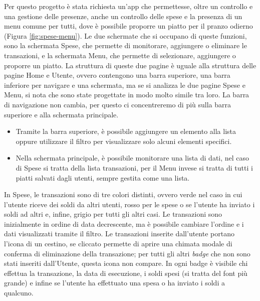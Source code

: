 Per questo progetto è stata richiesta un'app che permettesse, oltre un controllo e una gestione delle presenze, anche un controllo delle spese e la presenza di un menu comune per tutti, dove è possibile proporre un piatto per il pranzo odierno (Figura \ref{fig:spese-menu}).\newline
Le due schermate che si occupano di queste funzioni, sono la schermata Spese, che permette di monitorare, aggiungere o eliminare le transazioni, e la schermata Menu, che permette di selezionare, aggiungere o proporre un piatto.\newline
\newline
La struttura di queste due pagine è uguale alla struttura delle pagine Home e Utente, ovvero contengono una barra superiore, una barra inferiore per navigare e una schermata, ma se si analizza le due pagine Spese e Menu, si nota che sono state progettate in modo molto simile tra loro.\newline
La barra di navigazione non cambia, per questo ci concentreremo di più sulla barra superiore e alla schermata principale.
\begin{itemize}
    \item Tramite la barra superiore, è possibile aggiungere un elemento alla lista oppure utilizzare il filtro per visualizzare solo alcuni elementi specifici.
    \item Nella schermata principale, è possibile monitorare una lista di dati, nel caso di Spese si tratta della lista transazioni, per il Menu invese si tratta di tutti i piatti salvati dagli utenti, sempre gestita come una lista.
\end{itemize}
In Spese, le transazioni sono di tre colori distinti, ovvero verde nel caso in cui l'utente riceve dei soldi da altri utenti, rosso per le spese o se l'utente ha inviato i soldi ad altri e, infine, grigio per tutti gli altri casi.\newline
Le transazioni sono inizialmente in ordine di data decrescente, ma è possibile cambiare l'ordine e i dati visualizzati tramite il filtro.\newline
Le transazioni inserite dall'utente portano l'icona di un cestino, se cliccato permette di aprire una chimata modale di conferma di eliminazione della transazione; per tutti gli altri \emph{badge} che non sono stati inseriti dall'Utente, questa icona non compare.\newline
In ogni badge è visibile chi effettua la transazione, la data di esecuzione, i soldi spesi (si tratta del font più grande) e infine se l'utente ha effettuato una spesa o ha inviato i soldi a qualcuno.\newline
